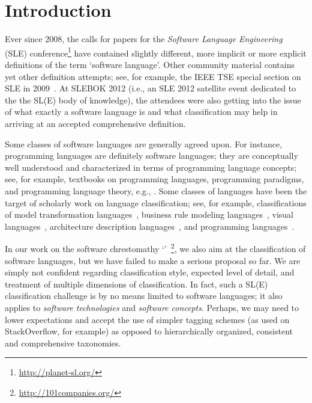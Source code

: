 
\section{Introduction}
\label{S:intro}

Ever since 2008, the calls for papers for the \emph{Software Language Engineering} (SLE) conference\footnote{\url{http://planet-sl.org/}} have contained slightly different, more implicit or more explicit definitions of the term `software language'. Other community material contains yet other definition attempts; see, for example, the IEEE TSE special section on SLE in 2009~\cite{FavreGLW09}. At SLEBOK 2012 (i.e., an SLE 2012 satellite event dedicated to the the SL(E) body of knowledge), the attendees were also getting into the issue of what exactly a software language is and what classification may help in arriving at an accepted comprehensive definition.

Some classes of software languages are generally agreed upon. For instance, programming languages are definitely software languages; they are conceptually well understood and characterized in terms of programming language concepts; see, for example, textbooks on programming languages, programming paradigms, and programming language theory, e.g., \cite{Mosses92,Sebesta12}. Some classes of languages have been the target of scholarly work on language classification; see, for example, classifications of model transformation languages~\cite{CzarneckiH06}, business rule modeling languages~\cite{SkalnaG12}, visual languages~\cite{BottoniG04,MarriottM97,BurnettB94}, architecture description languages~\cite{MedvidovicT00}, and programming languages~\cite{BabenkoRY75,DoyleS87}.

In our work on the software chrestomathy `\oneohone'~\cite{FavreLV12}\footnote{\url{http://101companies.org/}}, we also aim at the classification of software languages, but we have failed to make a serious proposal so far. We are simply not confident regarding classification style, expected level of detail, and treatment of multiple dimensions of classification. In fact, such a SL(E) classification challenge is by no means limited to software languages; it also applies to \emph{software technologies} and \emph{software concepts}. Perhaps, we may need to lower expectations and accept the use of simpler tagging schemes (as used on StackOverflow, for example) as opposed to hierarchically organized, consistent and comprehensive taxonomies.

